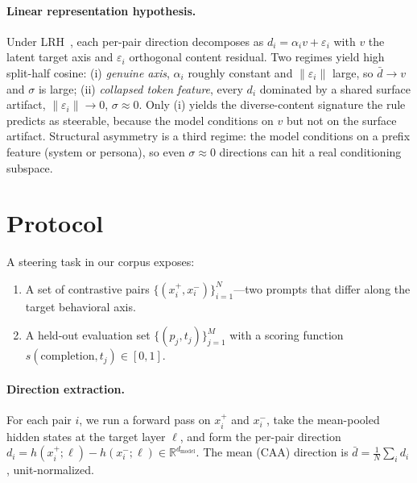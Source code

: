 \documentclass{article}
\begin{document}
\paragraph{Linear representation hypothesis.}
Under
LRH~\citep{mikolov2013linguistic,park2023linear,elhage2022superposition},
each per-pair direction decomposes as
$d_i = \alpha_i v + \varepsilon_i$ with $v$ the latent target axis
and $\varepsilon_i$ orthogonal content residual. Two regimes yield
high split-half cosine: (i) \emph{genuine axis}, $\alpha_i$ roughly
constant and $\|\varepsilon_i\|$ large, so $\bar{d} \!\to\! v$ and
$\sigma$ is large; (ii) \emph{collapsed token feature}, every $d_i$
dominated by a shared surface artifact, $\|\varepsilon_i\| \!\to\!
0$, $\sigma \!\approx\! 0$. Only (i) yields the diverse-content
signature the rule predicts as steerable, because the model
conditions on $v$ but not on the surface artifact. Structural
asymmetry is a third regime: the model conditions on a prefix
feature (system or persona), so even $\sigma \!\approx\! 0$
directions can hit a real conditioning subspace.

\section{Protocol}

A steering task in our corpus exposes:
\begin{enumerate}
\item A set of contrastive pairs
$\{(x_i^+, x_i^-)\}_{i=1}^N$---two prompts that differ along the
target behavioral axis.
\item A held-out evaluation set
$\{(p_j, t_j)\}_{j=1}^M$ with a scoring function
$s(\text{completion}, t_j) \in [0, 1]$.
\end{enumerate}

\paragraph{Direction extraction.}
For each pair $i$, we run a forward pass on $x_i^+$ and $x_i^-$,
take the mean-pooled hidden states at the target layer $\ell$, and
form the per-pair direction
$d_i = h(x_i^+; \ell) - h(x_i^-; \ell) \in \mathbb{R}^{d_{\text{model}}}$.
The mean (CAA) direction is $\bar d = \tfrac{1}{N}\sum_i d_i$,
unit-normalized.
\end{document}
